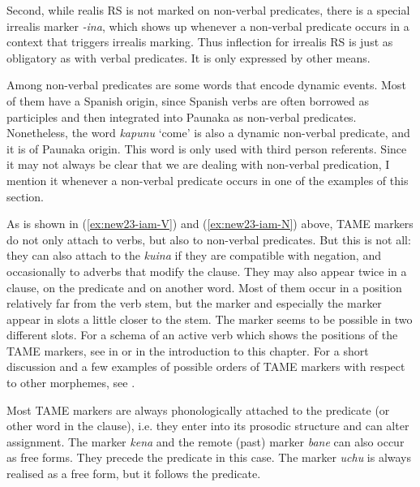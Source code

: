 Second, while realis RS is not marked on non-verbal predicates, there is a special irrealis marker \textit{-ina}, which shows up whenever a non-verbal predicate occurs in a context that triggers irrealis marking. Thus inflection for irrealis RS is just as obligatory as with verbal predicates. It is only expressed by other means.

Among non-verbal predicates are some words that encode dynamic events. Most of them have a Spanish origin, since Spanish verbs are often borrowed as participles and then integrated into Paunaka as non-verbal predicates. Nonetheless, the word \textit{kapunu} ‘come’ is also a dynamic non-verbal predicate, and it is of Paunaka origin. This word is only used with third person referents. Since it may not always be clear that we are dealing with non-verbal predication, I mention it whenever a non-verbal predicate occurs in one of the examples of this section.

As is shown in (\ref{ex:new23-iam-V}) and (\ref{ex:new23-iam-N}) above, TAME markers do not only attach to verbs, but also to non-verbal predicates. But this is not all: they can also attach to the  \textit{kuina} if they are compatible with negation, and occasionally to adverbs that modify the clause. They may also appear twice in a clause, on the predicate and on another word. Most of them occur in a position relatively far from the verb stem, but the  marker and especially the  marker appear in slots a little closer to the stem. The  marker seems to be possible in two different slots. For a schema of an active verb which shows the positions of the TAME markers, see  in  or  in the introduction to this chapter. For a short discussion and a few examples of possible orders of TAME markers with respect to other morphemes, see .

Most TAME markers are always phonologically attached to the predicate (or other word in the clause), i.e. they enter into its prosodic structure and can alter  assignment. The  marker \textit{kena} and the remote (past) marker \textit{bane} can also occur as free forms. They precede the predicate in this case. The  marker \textit{uchu} is always realised as a free form, but it follows the predicate.


